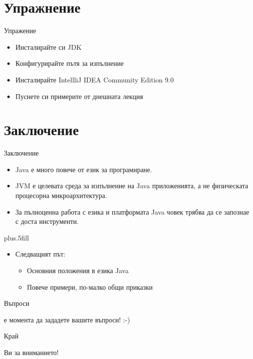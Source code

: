 \documentclass{beamer}
\begin{document}
\section{Упражнение}
\begin{frame}{Упражение}
  \transdissolve  
  \begin{itemize}
    \item Инсталирайте си JDK \pause
    \item Конфигурирайте пътя за изпълнение \pause
    \item Инсталирайте IntellliJ IDEA Community Edition 9.0 \pause
    \item Пуснете си примерите от днешната лекция \pause
  \end{itemize}
\end{frame}

\section*{Заключение}

\begin{frame}{Заключение}
  \transdissolve
  \begin{itemize}
  \item
    Java \alert{е много повече от език за програмиране}. \pause
  \item
    JVM \alert{е целевата среда за изпълнение} на Java приложенията, а
    не физическата процесорна микроархитектура. \pause
  \item
    За пълноценна работа с езика и платформата Java човек трябва да
    се запознае с доста инструменти.
  \end{itemize}
  \pause
  \vskip0pt plus.5fill
  \begin{itemize}
  \item
    Следващият път:
    \begin{itemize}
    \item
      Основния положения в езика Java
    \item
      Повече примери, по-малко общи приказки
    \end{itemize}
  \end{itemize}
\end{frame}

\begin{frame}{Въпроси}
  \transdissolve
  \begin{center}
     е момента да зададете вашите въпроси! :-)
  \end{center}
\end{frame}

\begin{frame}{Край}
  \transdissolve
  \begin{center}
     Ви за вниманието!
  \end{center}
\end{frame}
\end{document}

